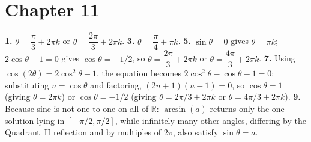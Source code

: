 \section*{Chapter 11}
\textbf{1.} $\theta = \dfrac{\pi}{3}+2\pi k$ or $\theta =
\dfrac{2\pi}{3}+2\pi k$. \quad
\textbf{3.} $\theta = \dfrac{\pi}{4}+\pi k$. \quad
\textbf{5.} $\sin\theta = 0$ gives $\theta = \pi k$; $2\cos\theta+1=0$
gives $\cos\theta = -1/2$, so $\theta = \dfrac{2\pi}{3}+2\pi k$ or
$\theta = \dfrac{4\pi}{3}+2\pi k$. \quad
\textbf{7.} Using $\cos(2\theta)=2\cos^2\theta-1$, the equation becomes
$2\cos^2\theta-\cos\theta-1=0$; substituting $u=\cos\theta$ and
factoring, $(2u+1)(u-1)=0$, so $\cos\theta=1$ (giving $\theta=2\pi k$) or
$\cos\theta=-1/2$ (giving $\theta = 2\pi/3+2\pi k$ or $\theta =
4\pi/3+2\pi k$). \quad
\textbf{9.} Because sine is not one-to-one on all of $\mathbb{R}$:
$\arcsin(a)$ returns only the one solution lying in
$[-\pi/2,\pi/2]$, while infinitely many other angles, differing by the
Quadrant~II reflection and by multiples of $2\pi$, also satisfy
$\sin\theta=a$.

